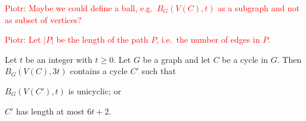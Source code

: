 \documentclass{patmorin}
\newcommand{\piotr}[1]{\textcolor{red}{Piotr: #1}}
\DeclareMathOperator{\girth}{girth}
\DeclareMathOperator{\dist}{dist}
\begin{document}
%
%
%
%
%
%
%
%
%
%
%
%
%

\piotr{Maybe we could define a ball, e.g.\ $B_G(V(C),t)$ as a subgraph and not as subset of vertices?}

\piotr{Let $|P|$ be the length of the path $P$, i.e.\ the number of edges in $P$.}

\begin{lem}\label{short_or_unicycle_nearby}
  Let $t$ be an integer with $t\ge 0$.
  Let $G$ be a graph and let $C$ be a cycle in $G$.
  Then $B_G(V(C),3t)$ contains a cycle $C'$ such that
  \begin{compactenum}[(a)]
    \item $B_G(V(C'),t)$ is unicyclic; or\label{short_or_unicycle_nearby:unicyclic}
    \item $C'$ has length at most $6t+2$.\label{short_or_unicycle_nearby:short}
  \end{compactenum}
\end{lem}
\end{document}
